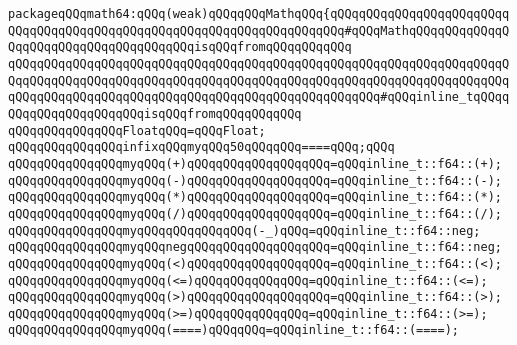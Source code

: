 \newline
\newline
\newline
\verb|packageqQQqmath64:qQQq(weak)qQQqqQQqMathqQQq{qQQqqQQqqQQqqQQqqQQqqQQqqQQqqQQqqQQqqQQqqQQqqQQqqQQqqQQqqQQqqQQqqQQqqQQq#qQQqMathqQQqqQQqqQQqqQQqqQQqqQQqqQQqqQQqqQQqqQQqisqQQqfromqQQqqQQqqQQq|\newline
\verb|qQQqqQQqqQQqqQQqqQQqqQQqqQQqqQQqqQQqqQQqqQQqqQQqqQQqqQQqqQQqqQQqqQQqqQQqqQQqqQQqqQQqqQQqqQQqqQQqqQQqqQQqqQQqqQQqqQQqqQQqqQQqqQQqqQQqqQQqqQQqqQQqqQQqqQQqqQQqqQQqqQQqqQQqqQQqqQQqqQQqqQQqqQQqqQQq#qQQqinline_tqQQqqQQqqQQqqQQqqQQqqQQqisqQQqfromqQQqqQQqqQQq|\newline
\newline
\verb|qQQqqQQqqQQqqQQqFloatqQQq=qQQqFloat;|\newline
\newline
\verb|qQQqqQQqqQQqqQQqinfixqQQqmyqQQq50qQQqqQQq====qQQq;qQQq|\newline
\newline
\verb|qQQqqQQqqQQqqQQqmyqQQq(+)qQQqqQQqqQQqqQQqqQQq=qQQqinline_t::f64::(+);|\newline
\verb|qQQqqQQqqQQqqQQqmyqQQq(-)qQQqqQQqqQQqqQQqqQQq=qQQqinline_t::f64::(-);|\newline
\verb|qQQqqQQqqQQqqQQqmyqQQq(*)qQQqqQQqqQQqqQQqqQQq=qQQqinline_t::f64::(*);|\newline
\verb|qQQqqQQqqQQqqQQqmyqQQq(/)qQQqqQQqqQQqqQQqqQQq=qQQqinline_t::f64::(/);|\newline
\verb|qQQqqQQqqQQqqQQqmyqQQqqQQqqQQqqQQq(-_)qQQq=qQQqinline_t::f64::neg;|\newline
\verb|qQQqqQQqqQQqqQQqmyqQQqnegqQQqqQQqqQQqqQQqqQQq=qQQqinline_t::f64::neg;|\newline
\verb|qQQqqQQqqQQqqQQqmyqQQq(<)qQQqqQQqqQQqqQQqqQQq=qQQqinline_t::f64::(<);|\newline
\verb|qQQqqQQqqQQqqQQqmyqQQq(<=)qQQqqQQqqQQqqQQq=qQQqinline_t::f64::(<=);|\newline
\verb|qQQqqQQqqQQqqQQqmyqQQq(>)qQQqqQQqqQQqqQQqqQQq=qQQqinline_t::f64::(>);|\newline
\verb|qQQqqQQqqQQqqQQqmyqQQq(>=)qQQqqQQqqQQqqQQq=qQQqinline_t::f64::(>=);|\newline
\verb|qQQqqQQqqQQqqQQqmyqQQq(====)qQQqqQQq=qQQqinline_t::f64::(====);|\newline
\newline
